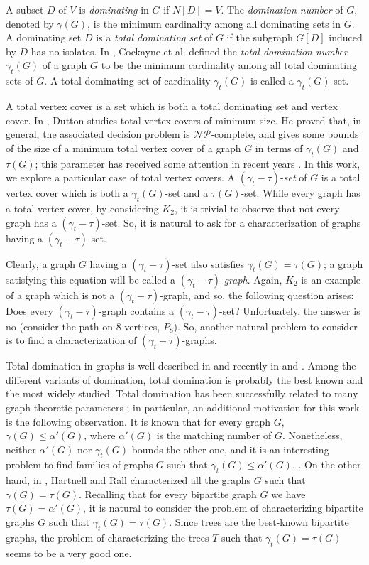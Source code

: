 \documentclass[12pt]{article}%
\theoremstyle{definition}
\newcommand{\gtt}{$(\gamma_t - \tau)$}
\begin{document}
A subset $D$ of $V$ is \emph{dominating} in $G$ if
$N[D]=V$. The \emph{domination number} of $G$,
denoted by  $\gamma (G)$, is the minimum cardinality
among all dominating sets in $G.$ A dominating set
$D$ is a \emph{total dominating set} of $G$ if the
subgraph $G[D]$ induced by $D$ has no isolates. In
\cite{cockayneN10}, Cockayne et al. defined the {\em
total domination number} $\gamma_{t}(G)$ of a graph
$G$ to be the minimum cardinality among all total
dominating sets of $G$. A total dominating set of
cardinality $\gamma_{t}(G)$ is called a
$\gamma_{t}(G)$-set.

A total vertex cover is a set which is both a total dominating set
and vertex cover.   In \cite{duttonBICA66}, Dutton studies
total vertex covers of minimum size. He proved that, in
general, the associated decision problem is
$\mathcal{NP}$-complete, and gives some bounds of the
size of a minimum total vertex cover of a graph $G$ in terms of
$\gamma_t (G)$ and $\tau (G)$; this parameter has received
some attention in recent years \cite{duttonDMGT33,li}.   In this
work, we explore a particular case of total vertex covers.   A
\gtt-{\em set} of $G$ is a total vertex cover which is both a
$\gamma_t (G)$-set and a $\tau (G)$-set.   While every graph
has a total vertex cover, by considering $K_2$, it is trivial to
observe that not every graph has a \gtt-set.   So, it is natural
to ask for a characterization of graphs having a \gtt-set.

Clearly, a graph $G$ having a \gtt-set also satisfies $\gamma_t
(G) = \tau (G)$; a graph satisfying this equation will be called
a \gtt-{\em graph}. Again, $K_2$ is an example of a graph which
is not a \gtt-graph, and so, the following question arises:   Does
every \gtt-graph contains a \gtt-set? Unfortuately, the answer is
no (consider the path on $8$ vertices, $P_8$).   So, another
natural problem to consider is to find a characterization of
\gtt-graphs.

Total domination in graphs is well described in
\cite{haynes1998} and recently in \cite{henningDM309} and
\cite{henning2013}. Among the different variants of domination,
total domination is probably the best known and the most widely
studied. Total domination has been successfully related to many
graph theoretic parameters \cite{henning2013}; in particular, an
additional motivation for this work is the following observation.
It is known that for every graph $G$, $\gamma (G) \le \alpha'
(G)$, where $\alpha' (G)$ is the matching number of $G$.
Nonetheless, neither $\alpha' (G)$ nor $\gamma_t (G)$
bounds the other one, and it is an interesting problem to find
families of graphs $G$ such that $\gamma_t (G) \le \alpha' (G)$,
\cite{henning2013}.   On the other hand, in \cite{hartnellCMJ45},
Hartnell and Rall characterized all the graphs $G$ such
that $\gamma (G) = \tau (G)$. Recalling that for every
bipartite graph $G$ we have $\tau (G) = \alpha' (G)$, it is
natural to consider the problem of characterizing bipartite
graphs $G$ such that $\gamma_t (G) = \tau (G)$.   Since
trees are the best-known bipartite graphs, the problem of
characterizing the trees $T$ such that $\gamma_t (G) =
\tau (G)$ seems to be a very good one.
\end{document}
